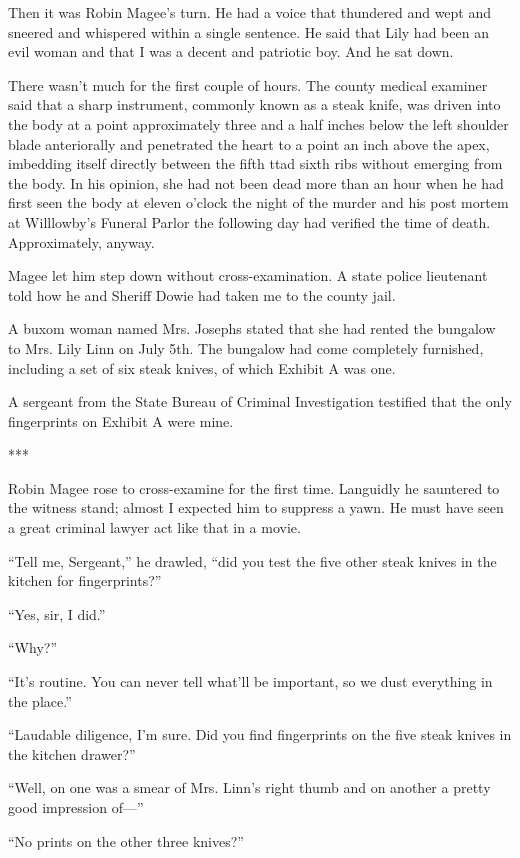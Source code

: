 \documentclass{novel}
\begin{document}
Then it was Robin Magee’s turn. He had a voice that thundered and wept and sneered and whispered within a single sentence. He said that Lily had been an evil woman and that I was a decent and patriotic boy. And he sat down.

There wasn’t much for the first couple of hours. The county medical examiner said that a sharp instrument, commonly known as a steak knife, was driven into the body at a point approximately three and a half inches below the left shoulder blade anteriorally and penetrated the heart to a point an inch above the apex, imbedding itself directly between the fifth ttad sixth ribs without emerging from the body. In his opinion, she had not been dead more than an hour when he had first seen the body at eleven o’clock the night of the murder and his post mortem at Willlowby’s Funeral Parlor the following day had verified the time of death. Approximately, anyway.

Magee let him step down without cross-examination. A state police lieutenant told how he and Sheriff Dowie had taken me to the county jail.

A buxom woman named Mrs. Josephs stated that she had rented the bungalow to Mrs. Lily Linn on July 5th. The bungalow had come completely furnished, including a set of six steak knives, of which Exhibit A was one.

A sergeant from the State Bureau of Criminal Investigation testified that the only fingerprints on Exhibit A were mine.

***

Robin Magee rose to cross-examine for the first time. Languidly he sauntered to the witness stand; almost I expected him to suppress a yawn. He must have seen a great criminal lawyer act like that in a movie.

“Tell me, Sergeant,” he drawled, “did you test the five other steak knives in the kitchen for fingerprints?”

“Yes, sir, I did.”

“Why?”

“It’s routine. You can never tell what’ll be important, so we dust everything in the place.”

“Laudable diligence, I’m sure. Did you find fingerprints on the five steak knives in the kitchen drawer?”

“Well, on one was a smear of Mrs. Linn’s right thumb and on another a pretty good impression of—”

“No prints on the other three knives?”
\end{document}
